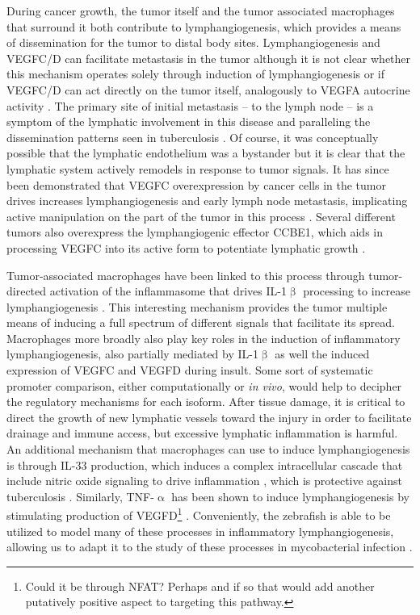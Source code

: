 During cancer growth, the tumor itself and the tumor associated macrophages that surround it both contribute to lymphangiogenesis, which provides a means of dissemination for the tumor to distal body sites. Lymphangiogenesis and VEGFC/D can facilitate metastasis in the tumor although it is not clear whether this mechanism operates solely through induction of lymphangiogenesis or if VEGFC/D can act directly on the tumor itself, analogously to VEGFA autocrine activity \citep{Stacker2014}. The primary site of initial metastasis -- to the lymph node -- is a symptom of the lymphatic involvement in this disease and paralleling the dissemination patterns seen in tuberculosis \citep{Ganchua2020}. Of course, it was conceptually possible that the lymphatic endothelium was a bystander but it is clear that the lymphatic system actively remodels in response to tumor signals. It has since been demonstrated that VEGFC overexpression by cancer cells in the tumor drives increases lymphangiogenesis and early lymph node metastasis, implicating active manipulation on the part of the tumor in this process \citep{Duong2012}. Several different tumors also overexpress the lymphangiogenic effector CCBE1, which aids in processing VEGFC into its active form to potentiate lymphatic growth \citep{Hogan2009, LeGuen2014, Li2018b, Zhao2018, Song2020}.

Tumor\hyp{}associated macrophages have been linked to this process through tumor\hyp{}directed activation of the inflammasome that drives IL\hyp{}1$\upbeta$ processing to increase lymphangiogenesis \citep{Weichand2017}. This interesting mechanism provides the tumor multiple means of inducing a full spectrum of different signals that facilitate its spread. Macrophages more broadly also play key roles in the induction of inflammatory lymphangiogenesis, also partially mediated by IL\hyp{}1$\upbeta$ as well the induced expression of VEGFC and VEGFD during insult. Some sort of systematic promoter comparison, either computationally or \textit{in vivo}, would help to decipher the regulatory mechanisms for each isoform. After tissue damage, it is critical to direct the growth of new lymphatic vessels toward the injury in order to facilitate drainage and immune access, but excessive lymphatic inflammation is harmful. An additional mechanism that macrophages can use to induce lymphangiogenesis is through IL\hyp{}33 production, which induces a complex intracellular cascade that include nitric oxide signaling to drive inflammation \citep{Han2017}, which is protective against tuberculosis \citep{Villarreal2015, Pineros2017}. Similarly, TNF\hyp{}$\upalpha$ has been shown to induce lymphangiogenesis by stimulating production of VEGFD\footnote{Could it be through NFAT? Perhaps and if so that would add another putatively positive aspect to targeting this pathway.} \citep{Hong2016}. Conveniently, the zebrafish is able to be utilized to model many of these processes in inflammatory lymphangiogenesis, allowing us to adapt it to the study of these processes in mycobacterial infection \citep{Okuda2015}.

